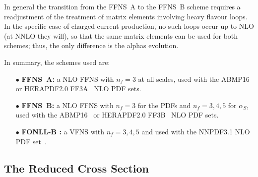 \documentclass[pdftex,twocolumn,epjc3]{svjour3}          %
\newcommand{\abmp} {ABMP16\xspace}
\newcommand{\nnpdf} {NNPDF3.1\xspace}
\newcommand{\ffns} {{FFNS~A}\xspace}
\newcommand{\ffnsb} {{FFNS~B}\xspace}
\newcommand{\ffthreea} {{\hbox{HERAPDF2.0} FF3A}\xspace}
\newcommand{\ffthreeb} {{\hbox{HERAPDF2.0} FF3B}\xspace}
\begin{document}
In general the transition from the FFNS~A to the
FFNS~B scheme requires a readjustment of the treatment of matrix elements 
involving heavy flavour loops. In the specific case of charged current production, 
no such loops occur up to NLO (at NNLO they will), so that the same 
matrix elements can be used for both schemes; thus, the only difference is 
the alphas evolution.
  
In summary, the schemes used are:
\begin{itemize}
  \setlength\itemsep{1em}

\item[$\bullet$] {\bf \ffns :} a NLO FFNS with $n_f = 3$ at all
  scales, used with the \abmp~\cite{Alekhin:2018pai} or
  \ffthreea~\cite{Abramowicz:2015mha} NLO PDF sets.

\item[$\bullet$] {\bf \ffnsb :} a NLO FFNS with $n_f = 3$ for the PDFs
  and $n_f = 3,4,5$ for $\alpha_S$, used with the
  \abmp~\cite{Alekhin:2018pai} or \ffthreeb~\cite{Abramowicz:2015mha}
  NLO PDF sets.

\item[$\bullet$] {\bf FONLL-B :} a VFNS with $n_f = 3,4,5$ and used
  with the \nnpdf NLO PDF set~\cite{Ball:2017nwa}.

\end{itemize}


\subsection{The Reduced Cross Section}
\end{document}
